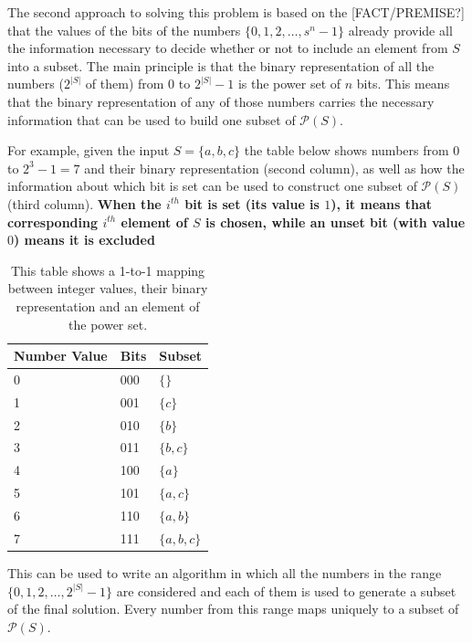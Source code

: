 The second approach to solving this problem is based on the [FACT/PREMISE?] that the values of the
bits of the numbers $\{0,1,2,\ldots, s^n-1\}$  already provide all the information necessary to decide whether or not to include an element from $S$ into a subset. 
The main principle is that the binary representation of all the numbers ($2^{|S|}$ of them) from $0$ to $2^{|S|}-1$ is the power set of $n$ bits.
This means that the binary representation of any of those numbers carries the necessary information that can be used to build one subset of $\mathcal{P}(S)$. 


For example, given the input $S=\{a,b,c\}$ the table below shows numbers from $0$ to $2^3-1 = 7$ and their binary
representation (second column), as well as how the information about which bit is set can be used to construct one subset of $\mathcal{P}(S)$ (third column).
\textbf{When the $i^{th}$ bit is set (its value is $1$), it means that
corresponding $i^{th}$ element of $S$ is chosen, while an unset bit (with value $0$) means it is
excluded}

\begin{table}
    \centering
    \begin{tabular}{|l|l|l|}
        \hline
        Number Value & Bits & Subset\\ \hline
        0     & 000  & $\{\}$\\ \hline
        1     & 001  & $\{c\}$\\ \hline
        2     & 010  & $\{b\}$\\ \hline
        3     & 011  & $\{b,c\}$\\ \hline
        4     & 100  & $\{a\}$\\ \hline
        5     & 101  & $\{a,c\}$\\ \hline
        6     & 110  & $\{a,b\}$\\ \hline
        7     & 111  & $\{a,b,c\}$ \\ \hline
    \end{tabular}
    \caption[Mapping between bits and element of the power set.]{This table shows a 1-to-1 mapping between integer values, their binary representation and an element of the power set.}
    \label{tab:mapping_value_bits}
\end{table}


This can be used to write an algorithm in which all the numbers in the range $\{0,1,2,\ldots,
2^{|S|}-1\}$ are considered and each of them is used to generate a subset of the final solution.
Every number from this range maps uniquely to a subset of $\mathcal{P}(S)$. 

